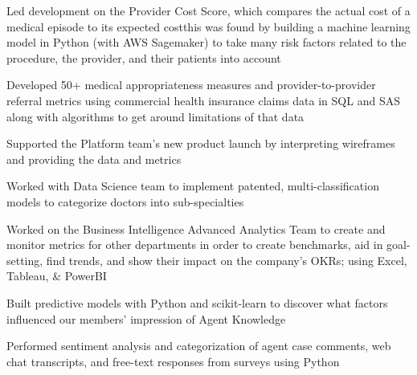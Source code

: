 \documentclass[a4paper]{deedy-resume-openfont} %
\begin{document}
\begin{minipage}[t]{0.66\textwidth}
\begin{tightitemize}
	\item Led development on the Provider Cost Score, which compares the actual cost of a medical episode to its expected cost\textemdash this was found by building a machine learning model in Python (with AWS Sagemaker) to take many risk factors related to the procedure, the provider, and their patients into account %
	\item Developed 50+ medical appropriateness measures and provider-to-provider referral metrics using commercial health insurance claims data in SQL and SAS along with algorithms to get around limitations of that data
	\item Supported the Platform team's new product launch by interpreting wireframes and providing the data and metrics
	\item Worked with Data Science team to implement patented, multi-classification models to categorize doctors into sub-specialties
\end{tightitemize}

\begin{tightitemize}
	\item Worked on the Business Intelligence Advanced Analytics Team to create and monitor metrics for other departments in order to create benchmarks, aid in goal-setting, find trends, and show their impact on the company's OKRs; using Excel, Tableau, \& PowerBI
	\item Built predictive models with Python and scikit-learn to discover what factors influenced our members' impression of Agent Knowledge
	\item Performed sentiment analysis and categorization of agent case comments, web chat transcripts, and free-text responses from surveys using Python
\end{tightitemize}



\end{minipage}
\end{document}
